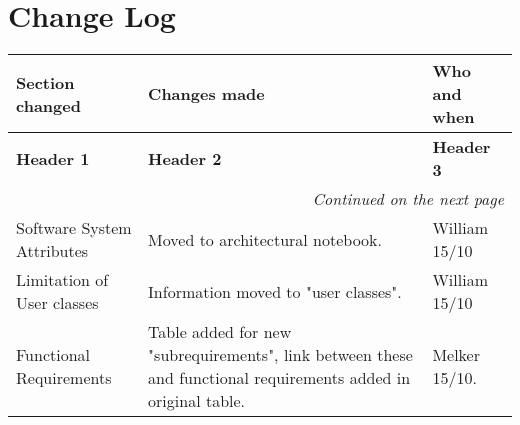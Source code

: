 \appendix
\section{Change Log}

\begin{longtable}{|l|p{8cm}|p{3cm}|}
\hline

\textbf{Section changed} & \textbf{Changes made} & \textbf{Who and when} \\
\hline
\endfirsthead

\hline
\textbf{Header 1} & \textbf{Header 2} & \textbf{Header 3} \\
\hline
\endhead

\hline \multicolumn{3}{|r|}{\textit{Continued on the next page}} \\
\hline
\endfoot

\hline
\endlastfoot
Software System Attributes & Moved to architectural notebook. & William 15/10 \\
\hline
Limitation of User classes & Information moved to "user classes". & William 15/10 \\
\hline
Functional Requirements & Table added for new "subrequirements", link between these and functional requirements added in original table. & Melker 15/10. \\
\hline
\end{longtable} 